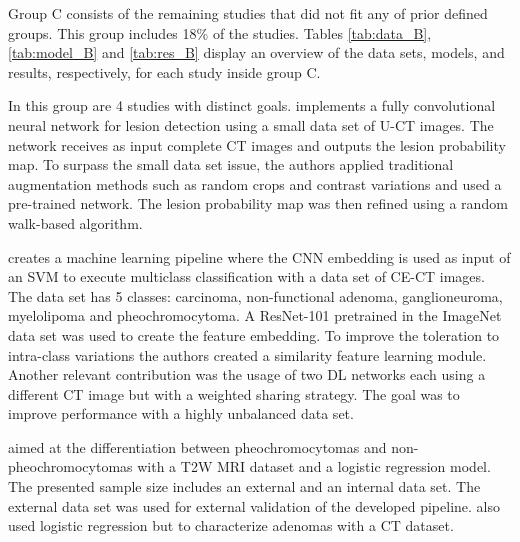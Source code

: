 \documentclass{article}
\begin{document}
Group C consists of the remaining studies that did not fit any of prior defined
groups.  This group includes 18\% of the studies. Tables \ref{tab:data_B},
\ref{tab:model_B} and \ref{tab:res_B} display an overview of the data sets,
models, and results, respectively, for each study inside group C.

In this group are 4 studies with distinct goals. \cite{Bi2017} implements a
fully convolutional neural network for lesion detection using a small data set
of U-CT images. The network receives as input complete CT images and outputs the
lesion probability map. To surpass the small data set issue, the authors applied
traditional augmentation methods such as random crops and contrast variations
and used a pre-trained network. The lesion probability map was then refined
using a random walk-based algorithm.

\cite{Bi2022} creates a machine learning pipeline where the CNN embedding is
used as input of an SVM to execute multiclass classification with a data set of
CE-CT images. The data set has 5 classes: carcinoma, non-functional adenoma,
ganglioneuroma, myelolipoma and pheochromocytoma. A ResNet-101 pretrained in the
ImageNet data set was used to create the feature embedding. To improve the
toleration to intra-class variations the authors created a similarity feature
learning module. Another relevant contribution was the usage of two DL networks
each using a different CT image but with a weighted sharing strategy. The goal
was to improve performance with a highly unbalanced data set.

\cite{Kong2022} aimed at the differentiation between pheochromocytomas and
non-pheochromocytomas with a T2W MRI dataset and a logistic regression model.
The presented sample size includes an external and an internal data set. The
external data set was used for external validation of the developed pipeline.
\cite{Zheng2020} also used logistic regression but to characterize adenomas with
a CT dataset.
\end{document}
